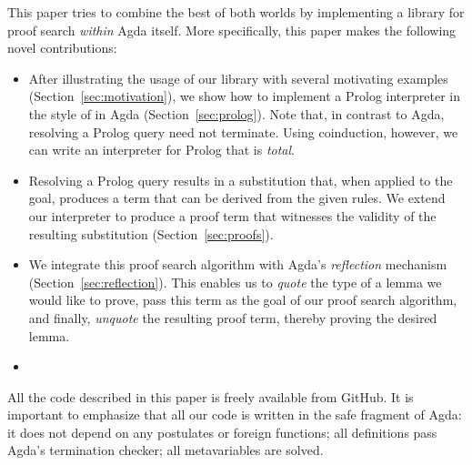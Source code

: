 \documentclass[preprint]{sigplanconf}
\begin{document}
This paper tries to combine the best of both worlds by implementing
a library for proof search \emph{within} Agda itself. More specifically,
this paper makes the following novel contributions:

\begin{itemize}
\item %
  After illustrating the usage of our library with several motivating
  examples (Section~\ref{sec:motivation}), we show how to implement a
  Prolog interpreter in the style of \citet{stutterheim} in Agda
  (Section~\ref{sec:prolog}). Note that, in contrast to Agda,
  resolving a Prolog query need not terminate. Using coinduction,
  however, we can write an interpreter for Prolog that is \emph{total}.
\item %
  Resolving a Prolog query results in a substitution that, when applied
  to the goal, produces a term that can be derived from the given
  rules. We extend our interpreter to produce a proof term that
  witnesses the validity of the resulting substitution
  (Section~\ref{sec:proofs}).
\item %
  We integrate this proof search algorithm with Agda's
  \emph{reflection} mechanism (Section~\ref{sec:reflection}). This
  enables us to \emph{quote} the type of a lemma we would like to
  prove, pass this term as the goal of our proof search algorithm, and
  finally, \emph{unquote} the resulting proof term, thereby proving
  the desired lemma.
\item %
   

\end{itemize}

All the code described in this paper is freely available from
GitHub. It is important to emphasize that all our code
is written in the safe fragment of Agda: it does not depend on any
postulates or foreign functions; all definitions pass Agda's
termination checker; all metavariables are solved.
\end{document}
